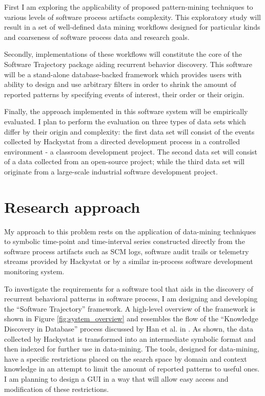\documentclass{sig-alternate}
\begin{document}
First I am exploring the applicability of proposed pattern-mining techniques to various levels of software process artifacts complexity. This exploratory study will result in a set of well-defined data mining workflows designed for particular kinds and coarseness of software process data and research goals. 

Secondly, implementations of these workflows will constitute the core of the Software Trajectory package aiding recurrent behavior discovery. This software will be a stand-alone database-backed framework which provides users with ability to design and use arbitrary filters in order to shrink the amount of reported patterns by specifying events of interest, their order or their origin.  

Finally, the approach implemented in this software system will be empirically evaluated. I plan to perform the evaluation on three types of data sets which differ by their origin and complexity: the first data set will consist of the events collected by Hackystat from a directed development process in a controlled environment - a classroom development project. The second data set will consist of a data collected from an open-source project; while the third data set will originate from a large-scale industrial software development project. 

\section{Research approach}
My approach to this problem rests on the application of data-mining techniques to symbolic time-point and time-interval series constructed directly from the software process artifacts such as SCM logs, software audit trails or telemetry streams provided by Hackystat or by a similar in-process software development monitoring system.

To investigate the requirements for a software tool that aids in the discovery of recurrent behavioral patterns in software process, I am designing and developing the ``Software Trajectory'' framework. A high-level overview of the framework is shown in Figure \ref{fig:system_overview} and resembles the flow of the ``Knowledge Discovery in Database'' process discussed by Han et al. in \cite{citeulike:709476}. As shown, the data collected by Hackystat is transformed into an intermediate symbolic format and then indexed for further use in data-mining. The tools, designed for data-mining, have a specific restrictions placed on the search space by domain and context knowledge in an attempt to limit the amount of reported patterns to useful ones. I am planning to design a GUI in a way that will allow easy access and modification of these restrictions.
\end{document}
